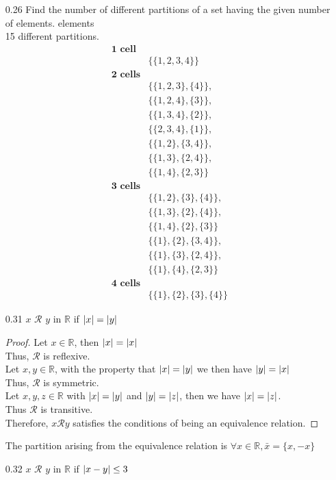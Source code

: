 \documentclass[12pt]{article}
\newcommand{\R}{\mathbb{R}}
\DeclarePairedDelimiter\abs{\lvert}{\rvert}
\begin{document}
\begin{enumerate}
	\item[0.26] Find the number of different partitions of a set having the given number of elements. elements \\
		15 different partitions.
		\begin{align*}
			\textbf{1 cell} \\
				&\{\{1,2,3,4\}\}\\
			\textbf{2 cells}\\
				&\{\{1,2,3\},\{4\}\},\\
				& \{\{1,2,4\},\{3\}\},\\
				& \{\{1,3,4\},\{2\}\},\\
				& \{\{2,3,4\},\{1\}\},\\
				& \{\{1,2\},\{3,4\}\},\\
				&\{\{1,3\},\{2,4\}\},\\
				&\{\{1,4\},\{2,3\}\}\\
			\textbf{3 cells}\\
				&\{\{1,2\},\{3\},\{4\}\},\\
				&\{\{1,3\},\{2\},\{4\}\},\\
				&\{\{1,4\},\{2\},\{3\}\}\\
				&\{\{1\},\{2\},\{3,4\}\},\\
				&\{\{1\},\{3\},\{2,4\}\},\\
				&\{\{1\},\{4\},\{2,3\}\}\\
			\textbf{4 cells}\\
				&\{\{1\},\{2\},\{3\},\{4\}\}
		\end{align*}
	\item[0.31] $x$ $\mathscr{R} $ $y$ in $\R$ if $\abs{x} = \abs{y}$
		\begin{proof}
			Let $x \in \R$, then $\abs{x} = \abs{x}$ \\
			Thus, $\mathscr{R}$ is reflexive.\\
			Let $x,y \in \R$, with the property that $\abs{x}=\abs{y}$ we then have $\abs{y}=\abs{x}$ \\
			Thus, $\mathscr{R}$ is symmetric.\\
			Let $x,y,z \in \R$ with  $\abs{x}=\abs{y}$ and $\abs{y}=\abs{z}$, then we have $\abs{x}=\abs{z}$. \\
			Thus $\mathscr{R}$ is transitive.\\
			Therefore, $x\mathscr{R} y$ satisfies the conditions of being an equivalence relation.		
		\end{proof}
		The partition arising from the equivalence relation is $\forall x \in \R, \bar{x} = \{x,-x\}$
	\item[0.32]  $x$ $\mathscr{R} $ $y$ in $\R$ if $\abs{x-y} \leq 3$ \\ \\

\end{enumerate}
\end{document}
